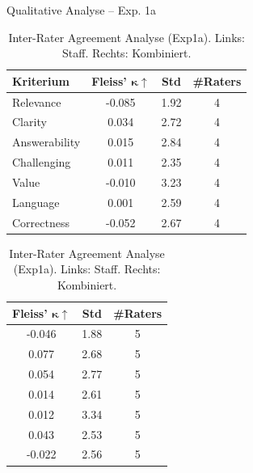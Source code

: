 \documentclass[usenames, dvipsnames, aspectratio=32]{beamer}
\begin{document}
\begin{frame}{Qualitative Analyse -- Exp. 1a}
    \begin{table}
        \centering
        \caption{Inter-Rater Agreement Analyse (Exp1a). \newline Links: Staff. Rechts: Kombiniert.}
        \label{tab:iaa-exp1a-side-by-side}
        \begin{minipage}[t]{0.45\linewidth}
            \centering
            \scriptsize
            \begin{tabular}{lccc}
                \toprule
                \textbf{Kriterium} & \textbf{Fleiss' $\mathbf{\kappa}\uparrow$} & \textbf{Std} & \textbf{\#Raters} \\
                \midrule
                Relevance      & -0.085 & 1.92 & 4 \\
                Clarity        &  0.034 & 2.72 & 4 \\
                Answerability  &  0.015 & 2.84 & 4 \\
                Challenging    &  0.011 & 2.35 & 4 \\
                Value          & -0.010 & 3.23 & 4 \\
                Language       &  0.001 & 2.59 & 4 \\
                Correctness    & -0.052 & 2.67 & 4 \\
                \bottomrule
            \end{tabular}
        \end{minipage}\hfill
        \begin{minipage}[t]{0.45\linewidth}
            \centering
            \scriptsize
            \begin{tabular}{ccc}
                \toprule
                \textbf{Fleiss' $\mathbf{\kappa}\uparrow$} & \textbf{Std} & \textbf{\#Raters} \\
                \midrule
                -0.046 & 1.88 & 5 \\
                 0.077 & 2.68 & 5 \\
                 0.054 & 2.77 & 5 \\
                 0.014 & 2.61 & 5 \\
                 0.012 & 3.34 & 5 \\
                 0.043 & 2.53 & 5 \\
                -0.022 & 2.56 & 5 \\
                \bottomrule
            \end{tabular}
        \end{minipage}
    \end{table}
\end{frame}
\end{document}
